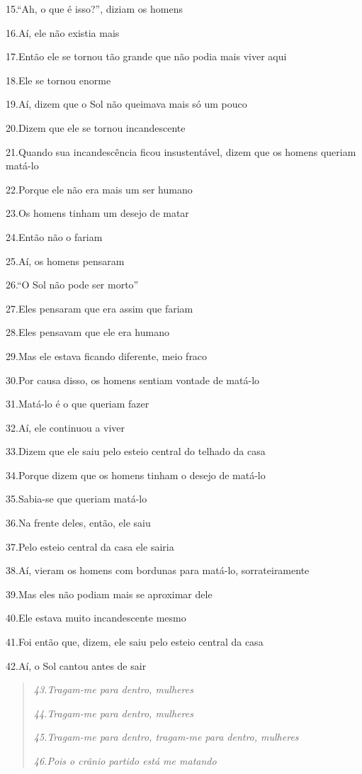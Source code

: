 15.``Ah, o que é isso?'', diziam os homens

16.Aí, ele não existia mais

17.Então ele se tornou tão grande que não podia mais viver aqui

18.Ele se tornou enorme

19.Aí, dizem que o Sol não queimava mais só um pouco

20.Dizem que ele se tornou incandescente

21.Quando sua incandescência ficou insustentável, dizem que os homens
queriam matá-lo

22.Porque ele não era mais um ser humano

23.Os homens tinham um desejo de matar

24.Então não o fariam

25.Aí, os homens pensaram

26.``O Sol não pode ser morto''

27.Eles pensaram que era assim que fariam

28.Eles pensavam que ele era humano

29.Mas ele estava ficando diferente, meio fraco

30.Por causa disso, os homens sentiam vontade de matá-lo

31.Matá-lo é o que queriam fazer

32.Aí, ele continuou a viver

33.Dizem que ele saiu pelo esteio central do telhado da casa

34.Porque dizem que os homens tinham o desejo de matá-lo

35.Sabia-se que queriam matá-lo

36.Na frente deles, então, ele saiu

37.Pelo esteio central da casa ele sairia

38.Aí, vieram os homens com bordunas para matá-lo, sorrateiramente

39.Mas eles não podiam mais se aproximar dele

40.Ele estava muito incandescente mesmo

41.Foi então que, dizem, ele saiu pelo esteio central da casa

42.Aí, o Sol cantou antes de sair

\begin{quote}
\emph{43.Tragam-me para dentro, mulheres}

\emph{44.Tragam-me para dentro, mulheres}

\emph{45.Tragam-me para dentro, tragam-me para dentro, mulheres}

\emph{46.Pois o crânio partido está me matando}
\end{quote}

